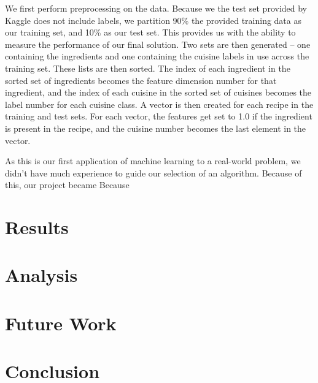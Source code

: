 \documentclass[11pt]{article}
\begin{document}
We first perform preprocessing on the data.  Because we the test set
provided by Kaggle does not include labels, we partition 90\% the
provided training data as our training set, and 10\% as our test set.
This provides us with the ability to measure the performance of our
final solution.  Two sets are then generated -- one containing the
ingredients and one containing the cuisine labels in use across the
training set.  These lists are then sorted.  The index of each
ingredient in the sorted set of ingredients becomes the feature
dimension number for that ingredient, and the index of each cuisine in
the sorted set of cuisines becomes the label number for each cuisine
class.  A vector is then created for each recipe in the training and
test sets.  For each vector, the features get set to 1.0 if the
ingredient is present in the recipe, and the cuisine number becomes
the last element in the vector.

As this is our first application of machine learning to a real-world
problem, we didn't have much experience to guide our selection of an
algorithm.  Because of this, our project became 
Because 


\section{Results}


\section{Analysis}


\section{Future Work}


\section{Conclusion}




\end{document}
